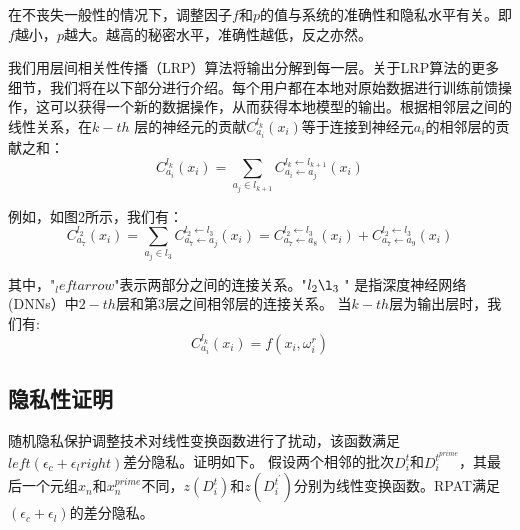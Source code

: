 在不丧失一般性的情况下，调整因子$f$和$p$的值与系统的准确性和隐私水平有关。即$f$越小，$p$越大。越高的秘密水平，准确性越低，反之亦然。

我们用层间相关性传播（LRP）算法将输出分解到每一层。关于LRP算法的更多细节，我们将在以下部分进行介绍。每个用户都在本地对原始数据进行训练前馈操作，这可以获得一个新的数据操作，从而获得本地模型的输出。根据相邻层之间的线性关系，在$k-t h$ 层的神经元的贡献$C_{a_{i}}^{l_{k}}\left(x_{i}\right)$等于连接到神经元$a_{i}$的相邻层的贡献之和：
\begin{equation}\label{eq:神经网络加噪4}
C_{a_{i}}^{l_{k}}\left(x_{i}\right)=\sum_{a_{j} \in l_{k+1}} C_{a_{i} \leftarrow a_{j}}^{l_{k} \leftarrow l_{k+1}}\left(x_{i}\right)
\end{equation}

例如，如图2所示，我们有：
$$
C_{a_{7}}^{l_{2}}\left(x_{i}\right)=\sum_{a_{j} \in l_{3}} C_{a_{7} \leftarrow a_{j}}^{l_{2} \leftarrow l_{3}}\left(x_{i}\right)=C_{a_{7} \leftarrow a_{8}}^{l_{2} \leftarrow l_{3}}\left(x_{i}\right)+C_{a_{7} \leftarrow a_{9}}^{l_{2} \leftarrow l_{3}}\left(x_{i}\right)
$$

其中，"$_leftarrow$"表示两部分之间的连接关系。"$l_{2} \l_{3}$ " 是指深度神经网络(DNNs）中$2-t h$层和第3层之间相邻层的连接关系。
当$k-t h$层为输出层时，我们有:
$$
C_{a_{i}}^{l_{k}}\left(x_{i}\right)=f\left(x_{i}, \omega_{i}^{r}\right)
$$

\subsection{隐私性证明}
随机隐私保护调整技术对线性变换函数进行了扰动，该函数满足$left(\epsilon_{c}+\epsilon_{l}right)$差分隐私。证明如下。
假设两个相邻的批次$D_{i}^{t}$和$D_{i}^{t^{prime}}$，其最后一个元组$x_{n}$和$x_{n}^{prime}$不同，$z\left(D_{i}^{t}\right)$和$z\left(D_{i}^{t^{\prime}}\right)$分别为线性变换函数。RPAT满足$\left(\epsilon_{c}+\epsilon_{l}\right)$的差分隐私。

